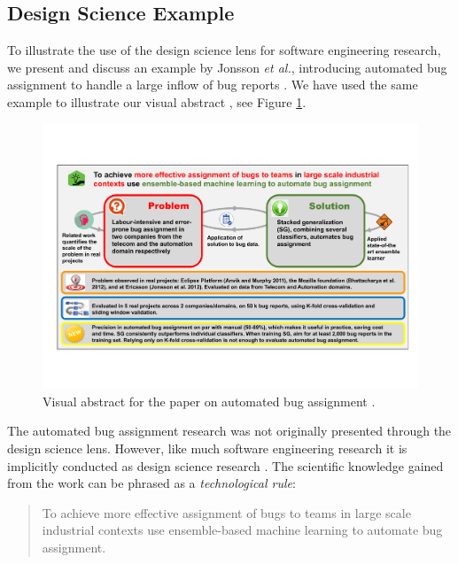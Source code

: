 \documentclass[graybox]{svmult}
\begin{document}
\subsection{Design Science Example}
\label{sec:examples}
To illustrate the use of the design science lens for software engineering research, we present and discuss an example by Jonsson \emph{et al.}, introducing automated bug assignment to handle a large inflow of bug reports \cite{JonssonBug15}. We have used the same example to illustrate our visual abstract \cite{StoreyESEM17}, see Figure \ref{fig:BugAssignment}.

\begin{figure}[t]
\begin{center}
\includegraphics[width=\columnwidth, trim={7mm 30mm 7mm 30mm },clip]{Figures/VATemplateJonsson.pdf}
\caption{Visual abstract for the paper on automated bug assignment \cite{JonssonBug15}.}
\label{fig:BugAssignment}
\end{center}
\end{figure}

The automated bug assignment research was not originally presented through the design science lens. However, like much software engineering research it is implicitly conducted as design science research \cite{Engstrom19arxiv}. 
The scientific knowledge gained from the work can be phrased as a \emph{technological rule}:
\begin{quote}{To achieve more effective assignment of bugs to teams in large scale industrial contexts use ensemble-based machine learning to automate bug assignment. \cite{StoreyESEM17}}\end{quote}
\end{document}

